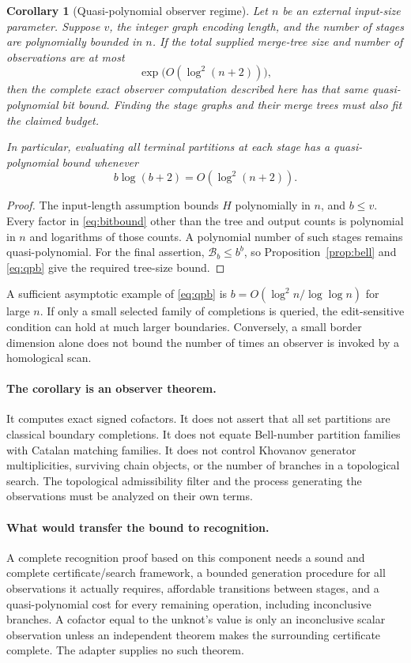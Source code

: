 \documentclass[11pt,letterpaper]{article}
\newtheorem{corollary}[theorem]{Corollary}
\theoremstyle{definition}\newtheorem{definition}[theorem]{Definition}
\theoremstyle{remark}\newtheorem{remark}[theorem]{Remark}
\begin{document}
\begin{corollary}[Quasi-polynomial observer regime]
\label{cor:qp}
Let $n$ be an external input-size parameter. Suppose $v$, the integer graph encoding length, and the number of stages are polynomially bounded in $n$. If the total supplied merge-tree size and number of observations are at most
\[
 \exp\!\bigl(O(\log^2(n+2))\bigr),
\]
then the complete exact observer computation described here has that same quasi-polynomial bit bound. Finding the stage graphs and their merge trees must also fit the claimed budget.

In particular, evaluating \emph{all} terminal partitions at each stage has a quasi-polynomial bound whenever
\begin{equation}
 b\log(b+2)=O(\log^2(n+2)).
 \label{eq:qpb}
\end{equation}
\end{corollary}
\begin{proof}
The input-length assumption bounds $H$ polynomially in $n$, and $b\leq v$. Every factor in \eqref{eq:bitbound} other than the tree and output counts is polynomial in $n$ and logarithms of those counts. A polynomial number of such stages remains quasi-polynomial. For the final assertion, $\mathcal B_b\leq b^b$, so Proposition~\ref{prop:bell} and \eqref{eq:qpb} give the required tree-size bound.
\end{proof}

A sufficient asymptotic example of \eqref{eq:qpb} is $b=O(\log^2 n/\log\log n)$ for large $n$. If only a small selected family of completions is queried, the edit-sensitive condition can hold at much larger boundaries. Conversely, a small border dimension alone does not bound the number of times an observer is invoked by a homological scan.

\paragraph{The corollary is an observer theorem.}
It computes exact signed cofactors. It does not assert that all set partitions are classical boundary completions. It does not equate Bell-number partition families with Catalan matching families. It does not control Khovanov generator multiplicities, surviving chain objects, or the number of branches in a topological search. The topological admissibility filter and the process generating the observations must be analyzed on their own terms.

\paragraph{What would transfer the bound to recognition.}
A complete recognition proof based on this component needs a sound and complete certificate/search framework, a bounded generation procedure for all observations it actually requires, affordable transitions between stages, and a quasi-polynomial cost for every remaining operation, including inconclusive branches. A cofactor equal to the unknot's value is only an inconclusive scalar observation unless an independent theorem makes the surrounding certificate complete. The adapter supplies no such theorem.
\end{document}
